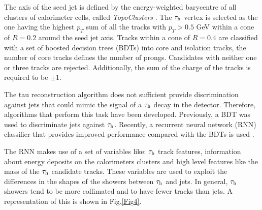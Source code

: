 The axis of the seed jet is defined by the energy-weighted barycentre of all clusters of calorimeter cells, called \textit{TopoClusters} \cite{Aad:2016upy}. The $\tau_\text{h}$ vertex is selected as the one having the highest $p_T$ sum of all the tracks with $p_T>0.5$ GeV within a cone of $R=0.2$ around the seed jet axis. Tracks within a cone of $R=0.4$ are classified with a set of boosted decision trees (BDTs) into core and isolation tracks, the number of core tracks defines the number of prongs. Candidates with neither one or three tracks are rejected. Additionally, the sum of the charge of the tracks is required to be $\pm 1$.     

The tau reconstruction algorithm does not sufficient provide discrimination against jets that could mimic the signal of a $\tau_\text{h}$ decay in the detector. Therefore, algorithms that perform this task have been developed. Previously, a BDT was used to discriminate jets against $\tau_\text{h}$. Recently, a recurrent neural network (RNN) classifier that provides improved performance compared with the BDTs is used \cite{Deutsch:2680523}.

The RNN makes use of a set of variables like: $\tau_\text{h}$ track features, information about energy deposits on the calorimeters clusters and high level features like the mass of the $\tau_\text{h}$ candidate tracks. These variables are used to exploit the differences in the shapes of the showers between $\tau_\text{h}$ and jets. In general, $\tau_\text{h}$ showers tend to be more collimated and to have fewer tracks than jets. A representation of this is shown in Fig.\ref{Fig4}. 


